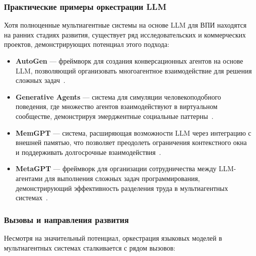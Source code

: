 \subsubsection{Практические примеры оркестрации LLM}

Хотя полноценные мультиагентные системы на основе LLM для ВПИ находятся на ранних стадиях развития, существует ряд исследовательских и коммерческих проектов, демонстрирующих потенциал этого подхода:

\begin{itemize}
    \item \textbf{AutoGen} — фреймворк для создания конверсационных агентов на основе LLM, позволяющий организовать многоагентное взаимодействие для решения сложных задач~\cite{wu2023autogen}.

    \item \textbf{Generative Agents} — система для симуляции человекоподобного поведения, где множество агентов взаимодействуют в виртуальном сообществе, демонстрируя эмерджентные социальные паттерны~\cite{park2023generative}.

    \item \textbf{MemGPT} — система, расширяющая возможности LLM через интеграцию с внешней памятью, что позволяет преодолеть ограничения контекстного окна и поддерживать долгосрочные взаимодействия~\cite{zhong2023memgpt}.

    \item \textbf{MetaGPT} — фреймворк для организации сотрудничества между LLM-агентами для выполнения сложных задач программирования, демонстрирующий эффективность разделения труда в мультиагентных системах~\cite{hong2023metagpt}.
\end{itemize}

\subsubsection{Вызовы и направления развития}

Несмотря на значительный потенциал, оркестрация языковых моделей в мультиагентных системах сталкивается с рядом вызовов:


